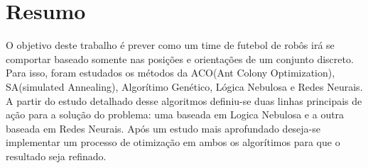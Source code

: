 \chapter*{Resumo}

O objetivo deste trabalho é prever como um time de futebol de robôs irá se comportar baseado
somente nas posições e orientações de um conjunto discreto. Para isso, foram estudados
os métodos da ACO(Ant Colony Optimization), SA(simulated Annealing), Algorítimo  Genético, Lógica Nebulosa
e Redes Neurais. A partir do estudo detalhado desse algoritmos definiu-se duas linhas principais de
ação para a solução do problema: uma baseada em Logica Nebulosa e a outra baseada em Redes Neurais. Após
um estudo mais aprofundado deseja-se implementar um processo de otimização em ambos os algorítimos para
que o resultado seja refinado.
